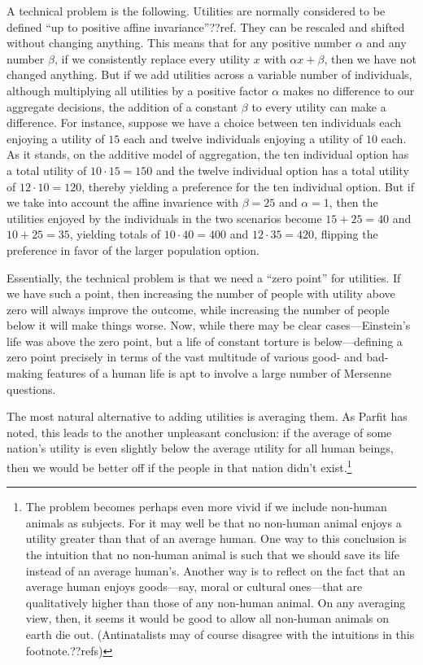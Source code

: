 A technical problem is the following. Utilities are normally considered to be defined ``up to positive
affine invariance''??ref. They can be rescaled and shifted without changing anything. This means that for any positive 
number $\alpha$ and any number $\beta$, if we consistently replace every utility $x$ with $\alpha x + \beta$, then 
we have not changed anything. But if we add utilities across a variable number of individuals, although multiplying all
utilities by a positive factor $\alpha$ makes no difference to our aggregate decisions, the addition of 
a constant $\beta$ to every utility can make a difference. For instance, suppose we have a choice between ten individuals
each enjoying a utility of $15$ each and twelve individuals enjoying a utility of $10$ each. As it stands, on
the additive model of aggregation, the ten individual option has a total utility of $10\cdot 15 = 150$ and the twelve
individual option has a total utility of $12\cdot 10 = 120$, thereby yielding a preference for the ten individual
option. But if we take into account the affine invarience with $\beta = 25$ and $\alpha=1$, then the utilities enjoyed 
by the individuals in the two scenarios become $15+25=40$ and $10+25=35$, yielding totals of $10\cdot 40=400$ and 
$12\cdot 35=420$, flipping the preference in favor of the larger population option. 

Essentially, the technical problem is that we need a ``zero point'' for utilities. If we have such a point, then increasing
the number of people with utility above zero will always improve the outcome, while increasing the number of people below it
will make things worse. Now, while there may be clear cases---Einstein's life was above the zero point, but a life of constant
torture is below---defining a zero point precisely in terms of the vast multitude of various good- and bad-making features of 
a human life is apt to involve a large number of Mersenne questions.

The most natural alternative to adding utilities is averaging them. As Parfit has noted, this leads to the another
unpleasant conclusion: if the average of some nation's utility is even slightly below the average utility for all
human beings, then we would be better off if the people in that nation didn't exist.\footnote{The problem becomes
perhaps even more vivid if we include non-human animals as subjects. For it may well be that no non-human animal
enjoys a utility greater than that of an average human. One way to this conclusion is the intuition that no 
non-human animal is such that we should save its life instead of an average human's. Another way is to reflect on
the fact that an average human enjoys goods---say, moral or cultural ones---that are qualitatively higher than those
of any non-human animal. On any averaging view, then, it seems it would be good to allow all non-human animals on 
earth die out. (Antinatalists may of course disagree with the intuitions in this footnote.??refs)} 

